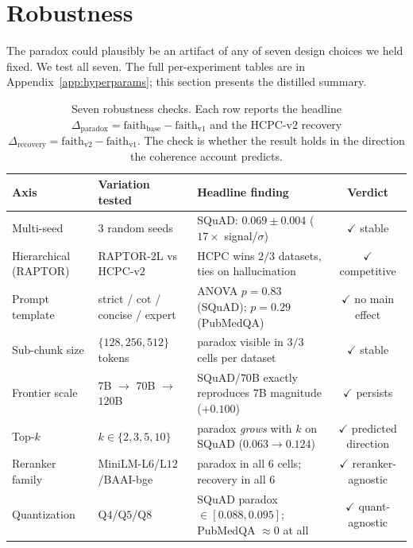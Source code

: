 \section{Robustness}
\label{sec:robustness}

The paradox could plausibly be an artifact of any of seven design
choices we held fixed. We test all seven. The full per-experiment
tables are in Appendix~\ref{app:hyperparams}; this section presents the
distilled summary.

\begin{table}[!htb]
\centering
\caption{Seven robustness checks. Each row reports the headline
$\Delta_{\textrm{paradox}} = \textrm{faith}_{\textrm{base}} -
\textrm{faith}_{\textrm{v1}}$ and the HCPC-v$2$ recovery
$\Delta_{\textrm{recovery}} = \textrm{faith}_{\textrm{v2}} -
\textrm{faith}_{\textrm{v1}}$. The check is whether the result holds
in the direction the coherence account predicts.}
\label{tab:robustness_summary}
\footnotesize
\begin{tabular}{lllc}
\toprule
Axis & Variation tested & Headline finding & Verdict \\
\midrule
Multi-seed              & $3$ random seeds                    & SQuAD: $0.069 \pm 0.004$ ($17\times$ signal/$\sigma$)               & $\checkmark$ stable \\
Hierarchical (RAPTOR)   & RAPTOR-$2$L vs HCPC-v$2$            & HCPC wins $2/3$ datasets, ties on hallucination                    & $\checkmark$ competitive \\
Prompt template         & strict / cot / concise / expert     & ANOVA $p=0.83$ (SQuAD); $p=0.29$ (PubMedQA)                          & $\checkmark$ no main effect \\
Sub-chunk size          & $\{128, 256, 512\}$ tokens          & paradox visible in $3/3$ cells per dataset                          & $\checkmark$ stable \\
Frontier scale          & $7$B $\to$ $70$B $\to$ $120$B      & SQuAD/$70$B exactly reproduces $7$B magnitude ($+0.100$)            & $\checkmark$ persists \\
Top-$k$                 & $k \in \{2, 3, 5, 10\}$             & paradox \emph{grows} with $k$ on SQuAD ($0.063 \to 0.124$)          & $\checkmark$ predicted direction \\
Reranker family         & MiniLM-L$6$/L$12$/BAAI-bge          & paradox in all $6$ cells; recovery in all $6$                       & $\checkmark$ reranker-agnostic \\
Quantization            & Q$4$/Q$5$/Q$8$                      & SQuAD paradox $\in [0.088, 0.095]$; PubMedQA $\approx 0$ at all     & $\checkmark$ quant-agnostic \\

\end{tabular}
\end{table}
